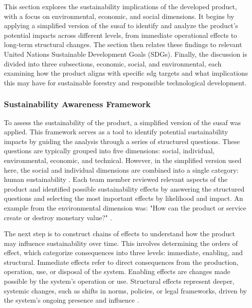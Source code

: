 This section explores the sustainability implications of the developed product, with a focus on environmental, economic, and social dimensions. It begins by applying a simplified version of the \acrfull{susaf} to identify and analyze the product's potential impacts across different levels, from immediate operational effects to long-term structural changes. The section then relates these findings to relevant United Nations Sustainable Development Goals (SDGs). Finally, the discussion is divided into three subsections, economic, social, and environmental, each examining how the product aligns with specific \acrshort{sdg} targets and what implications this may have for sustainable forestry and responsible technological development.

\subsubsection{Sustainability Awareness Framework}\label{subsubsec:discussion:product:sustainability:susaf}

To assess the sustainability of the product, a simplified version of the \acrfull{susaf} was applied. This framework serves as a tool to identify potential sustainability impacts by guiding the analysis through a series of structured questions. These questions are typically grouped into five dimensions: social, individual, environmental, economic, and technical. However, in the simplified version used here, the social and individual dimensions are combined into a single category: human sustainability \cite{ntnususaf}. Each team member reviewed relevant aspects of the product and identified possible sustainability effects by answering the structured questions and selecting the most important effects by likelihood and impact. An example from the environmental dimension was: "How can the product or service create or destroy monetary value?" \cite{susosusaf}.

The next step is to construct chains of effects to understand how the product may influence sustainability over time. This involves determining the orders of effect, which categorize consequences into three levels: immediate, enabling, and structural. Immediate effects refer to direct consequences from the production, operation, use, or disposal of the system. Enabling effects are changes made possible by the system's operation or use. Structural effects represent deeper, systemic changes, such as shifts in norms, policies, or legal frameworks, driven by the system's ongoing presence and influence \cite{susosusaf}.

